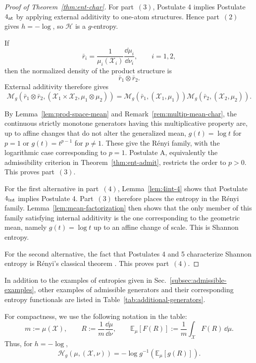 \documentclass[reqno]{amsart}
\begin{document}
\begin{proof}[Proof of Theorem~\ref{thm:ent-char}]
For part~$(3)$, Postulate 4 implies Postulate $4_{\rm at}$ by applying
external additivity to one-atom structures. Hence part~$(2)$ gives
$h=-\log$, so $\mathcal H$ is a $g$-entropy.

If
$$
\bar r_i
=
\frac{1}{\mu_i(\mathcal X_i)}
\frac{\dd\mu_i}{\dd\nu_i},
\qquad
i=1,2,
$$
then the normalized density of the product structure is
$$
\bar r_1\otimes\bar r_2.
$$
External additivity therefore gives
$$
\mathcal M_g
\left(
\bar r_1\otimes\bar r_2,
(\mathcal X_1\times\mathcal X_2,\mu_1\otimes\mu_2)
\right)
=
\mathcal M_g(\bar r_1,(\mathcal X_1,\mu_1))
\mathcal M_g(\bar r_2,(\mathcal X_2,\mu_2)).
$$


By Lemma~\ref{lem:prod-space-mean} and
Remark~\ref{rem:multip-mean-char}, the continuous strictly monotone
generators having this multiplicative property are, up to affine changes
that do not alter the generalized mean,
$g(t)=\log t$ for $p=1$ or $g(t)=t^{p-1}$ for $p\ne1$.
These give the R\'enyi family, with the logarithmic case corresponding to
$p=1$. Postulate A, equivalently the admissibility criterion in
Theorem~\ref{thm:ent-admit}, restricts the order to $p>0$. This proves part~$(3)$.

For the first alternative in part~$(4)$,
Lemma~\ref{lem:4int-4} shows that Postulate $4_{\rm int}$ implies
Postulate 4. Part~$(3)$ therefore places the entropy in the R\'enyi
family. Lemma~\ref{lem:mean-factorization} then shows that the only member
of this family satisfying internal additivity is the one corresponding to
the geometric mean, namely $g(t)=\log t$ up to an affine change of scale. This is Shannon entropy.

For the second alternative, the fact that Postulates 4 and 5 characterize Shannon entropy is R\'enyi's classical theorem \cite{Ren61}. This proves part~$(4)$.
\end{proof}

In addition to the examples of entropies given in Sec.~\ref{subsec:admissible-examples}, other examples of admissible generators and their corresponding entropy functionals are listed in Table~\ref{tab:additional-generators}.

For compactness, we use the following notation in the table:
$$
m:=\mu(\mathcal X),
\qquad
R:=\frac{1}{m}\frac{\dd\mu}{\dd\nu},
\qquad
\mathbb E_\mu[F(R)]
:=
\frac{1}{m}\int_{\mathcal X}F(R)\,\dd\mu.
$$
Thus, for $h=-\log$,
$$
\mathcal H_g(\mu,(\mathcal X,\nu))
=
-\log g^{-1}\left(\mathbb E_\mu[g(R)]\right).
$$
\end{document}
